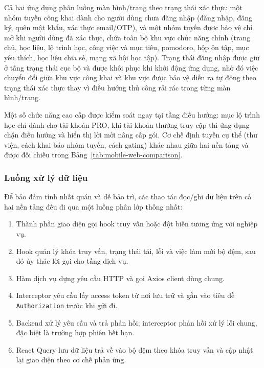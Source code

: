Cả hai ứng dụng phân luồng màn hình/trang theo trạng thái xác thực: một nhóm tuyến công khai dành cho người dùng chưa đăng nhập (đăng nhập, đăng ký, quên mật khẩu, xác thực email/OTP), và một nhóm tuyến được bảo vệ chỉ mở khi người dùng đã xác thực, chứa toàn bộ khu vực chức năng chính (trang chủ, học liệu, lộ trình học, công việc và mục tiêu, pomodoro, hộp ôn tập, mục yêu thích, học liệu chia sẻ, mạng xã hội học tập). Trạng thái đăng nhập được giữ ở tầng trạng thái cục bộ và được khôi phục khi khởi động ứng dụng, nhờ đó việc chuyển đổi giữa khu vực công khai và khu vực được bảo vệ diễn ra tự động theo trạng thái xác thực thay vì điều hướng thủ công rải rác trong từng màn hình/trang.

Một số chức năng cao cấp được kiểm soát ngay tại tầng điều hướng: mục lộ trình học chỉ dành cho tài khoản PRO, khi tài khoản thường truy cập thì ứng dụng chặn điều hướng và hiển thị lời mời nâng cấp gói. Cơ chế định tuyến cụ thể (thư viện, cách khai báo nhóm tuyến, cách gating) khác nhau giữa hai nền tảng và được đối chiếu trong Bảng~\ref{tab:mobile-web-comparison}.

\subsubsection{Luồng xử lý dữ liệu}
\label{subsubsec:frontend-dataflow}

Để bảo đảm tính nhất quán và dễ bảo trì, các thao tác đọc/ghi dữ liệu trên cả hai nền tảng đều đi qua một luồng phân lớp thống nhất:

\begin{enumerate}
    \item Thành phần giao diện gọi hook truy vấn hoặc đột biến tương ứng với nghiệp vụ.
    \item Hook quản lý khóa truy vấn, trạng thái tải, lỗi và việc làm mới bộ đệm, sau đó ủy thác lời gọi cho tầng dịch vụ.
    \item Hàm dịch vụ dựng yêu cầu HTTP và gọi Axios client dùng chung.
    \item Interceptor yêu cầu lấy access token từ nơi lưu trữ và gắn vào tiêu đề \texttt{Authorization} trước khi gửi đi.
    \item Backend xử lý yêu cầu và trả phản hồi; interceptor phản hồi xử lý lỗi chung, đặc biệt là trường hợp phiên hết hạn.
    \item React Query lưu dữ liệu trả về vào bộ đệm theo khóa truy vấn và cập nhật lại giao diện theo cơ chế phản ứng.
\end{enumerate}

